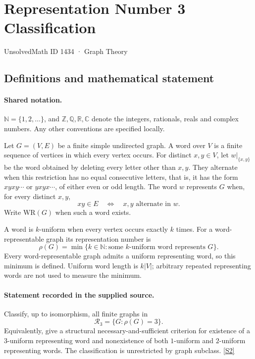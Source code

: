 \documentclass[11pt]{article}
\newcommand{\sref}[2]{\hyperlink{source:#1:#2}{[S#2]}}
\begin{document}
\setcounter{section}{1433}
\section{Representation Number 3 Classification}\label{1434}
{\small\sffamily UnsolvedMath ID 1434 · Graph Theory}
\subsection{Definitions and mathematical statement}

\paragraph{Shared notation.}$\mathbb N=\{1,2,\ldots\}$, and $\mathbb Z,\mathbb Q,\mathbb R,\mathbb C$ denote the integers, rationals, reals and complex numbers. Any other conventions are specified locally.


Let $G=(V,E)$ be a finite simple undirected graph. A word over $V$ is a finite sequence of vertices in which every vertex occurs. For distinct $x,y\in V$, let $w|_{\{x,y\}}$ be the word obtained by deleting every letter other than $x,y$. They alternate when this restriction has no equal consecutive letters, that is, it has the form $xyxy\cdots$ or $yxyx\cdots$, of either even or odd length. The word $w$ represents $G$ when, for every distinct $x,y$,
\[
 xy\in E\quad\Longleftrightarrow\quad x,y\text{ alternate in }w.
\]
Write $\mathrm{WR}(G)$ when such a word exists.

A word is $k$-uniform when every vertex occurs exactly $k$ times. For a word-representable graph its representation number is
\[
 \rho(G)=\min\{k\in\mathbb N:\text{some }k\text{-uniform word represents }G\}.
\]
Every word-representable graph admits a uniform representing word, so this minimum is defined. Uniform word length is $k|V|$; arbitrary repeated representing words are not used to measure the minimum.


\paragraph{Statement recorded in the supplied source.}
Classify, up to isomorphism, all finite graphs in
\[
 \mathcal R_3=\{G:\rho(G)=3\}.
\]
Equivalently, give a structural necessary-and-sufficient criterion for existence of a $3$-uniform representing word and nonexistence of both $1$-uniform and $2$-uniform representing words. The classification is unrestricted by graph subclass. \sref{1434}{2}
\end{document}
